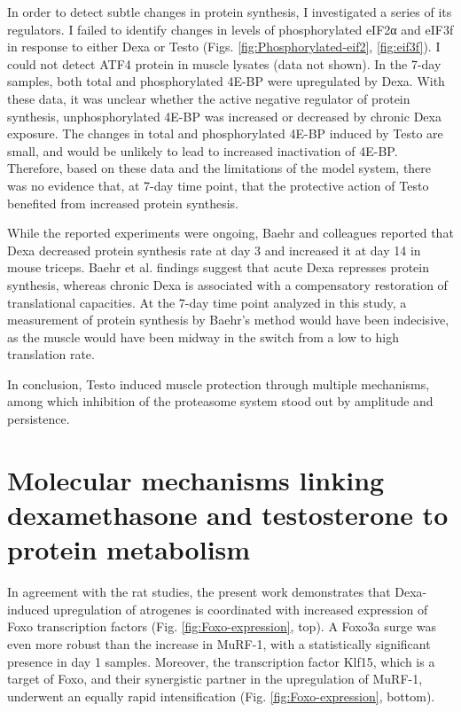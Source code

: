 \documentclass[12pt,english]{report}\usepackage[]{graphicx}\usepackage[]{color}
\begin{document}
In order to detect subtle changes in protein synthesis, I investigated
a series of its regulators. I failed to identify changes in levels
of phosphorylated eIF2α and eIF3f in response to either Dexa or Testo
(Figs. \ref{fig:Phosphorylated-eif2}, \ref{fig:eif3f}). I could
not detect ATF4 protein in muscle lysates (data not shown). In the
7-day samples, both total and phosphorylated 4E-BP were upregulated
by Dexa. With these data, it was unclear whether the active negative
regulator of protein synthesis, unphosphorylated 4E-BP was increased
or decreased by chronic Dexa exposure. The changes in total and phosphorylated
4E-BP induced by Testo are small, and would be unlikely to lead to
increased inactivation of 4E-BP. Therefore, based on these data and
the limitations of the model system, there was no evidence that, at
7-day time point, that the protective action of Testo benefited from
increased protein synthesis.

While the reported experiments were ongoing, Baehr and colleagues
reported that Dexa decreased protein synthesis rate at day 3 and increased
it at day 14 in mouse triceps\citep{baehr2011muscle}. Baehr et al.
findings suggest that acute Dexa represses protein synthesis, whereas
chronic Dexa is associated with a compensatory restoration of translational
capacities. At the 7-day time point analyzed in this study, a measurement
of protein synthesis by Baehr’s method would have been indecisive,
as the muscle would have been midway in the switch from a low to high
translation rate.

In conclusion, Testo induced muscle protection through multiple mechanisms,
among which inhibition of the proteasome system stood out by amplitude
and persistence.


\section{Molecular mechanisms linking dexamethasone and testosterone to protein
metabolism}

In agreement with the rat studies, the present work demonstrates that
Dexa-induced upregulation of atrogenes is coordinated with increased
expression of Foxo transcription factors (Fig. \ref{fig:Foxo-expression},
top). A Foxo3a surge was even more robust than the increase in MuRF-1,
with a statistically significant presence in day 1 samples. Moreover,
the transcription factor Klf15, which is a target of Foxo, and their
synergistic partner in the upregulation of MuRF-1, underwent an equally
rapid intensification (Fig. \ref{fig:Foxo-expression}, bottom).
\end{document}
